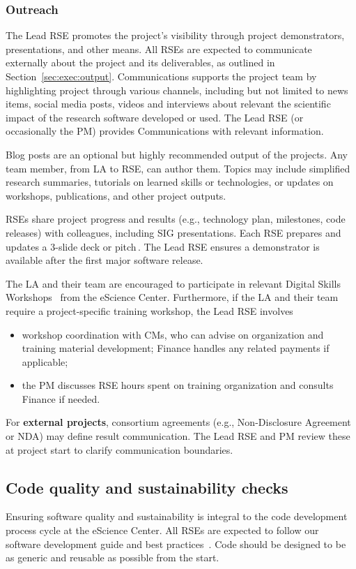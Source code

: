 \subsubsection{Outreach}
\label{sec:exec:outreach}
The Lead RSE promotes the project's visibility through project demonstrators, presentations, and
other means. All RSEs are expected to communicate externally about the project and its deliverables, as
outlined in Section~\ref{sec:exec:output}. Communications supports the project team by 
highlighting project through various channels, including but not limited to news items, social media
posts, videos and interviews about relevant the scientific impact of the research software developed 
or used. The Lead RSE (or occasionally the PM) provides Communications with relevant information. 


Blog posts are an optional but highly recommended output of the projects. Any team member, from LA to RSE, can author them. 
Topics may include simplified research summaries, tutorials on learned skills or technologies, or updates on workshops, publications, and other project outputs.

RSEs share project progress and results (e.g., technology plan, milestones, code releases) with colleagues, 
including SIG presentations. Each RSE prepares and updates a 3-slide deck or pitch \cite{proj-portfolio}. 
The Lead RSE ensures a demonstrator is available after the first major software release.


The LA and their team are encouraged to participate in relevant Digital Skills Workshops~\cite{digital-skills} from the eScience Center. Furthermore, if the LA and their team
require a project-specific training workshop, the Lead RSE involves
\begin{itemize}
\item workshop coordination with CMs, who can advise on organization and training material development; Finance handles any related payments if applicable;
\item the PM discusses RSE hours spent on training organization and consults Finance if needed.
\end{itemize}

For \textbf{external projects}, consortium agreements (e.g., Non-Disclosure Agreement or NDA) may define result communication. The Lead RSE and PM review these at project start to clarify communication boundaries.

\subsection{Code quality and sustainability checks}
Ensuring software quality and sustainability is integral to the code development process cycle at the eScience
Center. All RSEs are expected to follow our software development guide and best practices~\cite{guide-nlesc}. Code should be 
designed to be as generic and reusable as possible from the start.

